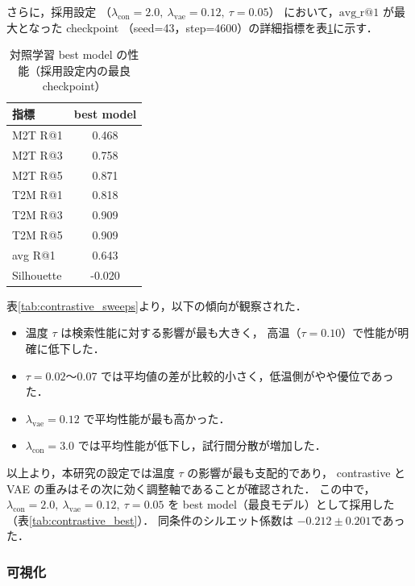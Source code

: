 さらに，採用設定
（$\lambda_{\mathrm{con}}=2.0,\ \lambda_{\mathrm{vae}}=0.12,\ \tau=0.05$）
において，$\mathrm{avg\_r@1}$ が最大となった checkpoint
（seed=43，step=4600）の詳細指標を表\ref{tab:contrastive_best_checkpoint}に示す．

\begin{table}[H]
  \centering
  \caption{対照学習 best model の性能（採用設定内の最良 checkpoint）}
  \label{tab:contrastive_best_checkpoint}
  \begin{tabular}{lc} \toprule
    \textbf{指標} & \textbf{best model} \\ \midrule
    M2T R@1       & 0.468               \\
    M2T R@3       & 0.758               \\
    M2T R@5       & 0.871               \\
    T2M R@1       & 0.818               \\
    T2M R@3       & 0.909               \\
    T2M R@5       & 0.909               \\
    avg R@1       & 0.643               \\
    Silhouette    & -0.020              \\ \bottomrule
  \end{tabular}
\end{table}

表\ref{tab:contrastive_sweeps}より，以下の傾向が観察された．
\begin{itemize}
  \item 温度 $\tau$ は検索性能に対する影響が最も大きく，
        高温（$\tau=0.10$）で性能が明確に低下した．
  \item $\tau=0.02$〜0.07 では平均値の差が比較的小さく，低温側がやや優位であった．
  \item $\lambda_{\mathrm{vae}}=0.12$ で平均性能が最も高かった．
  \item $\lambda_{\mathrm{con}}=3.0$ では平均性能が低下し，試行間分散が増加した．
\end{itemize}
以上より，本研究の設定では温度 $\tau$ の影響が最も支配的であり，
contrastive と VAE の重みはその次に効く調整軸であることが確認された．
この中で，$\lambda_{\mathrm{con}}=2.0,\ \lambda_{\mathrm{vae}}=0.12,\ \tau=0.05$ を
best model（最良モデル）として採用した（表\ref{tab:contrastive_best}）．
同条件のシルエット係数は $-0.212 \pm 0.201$であった．

\subsubsection{可視化}
\label{subsubsec:contrastive_visualization}

